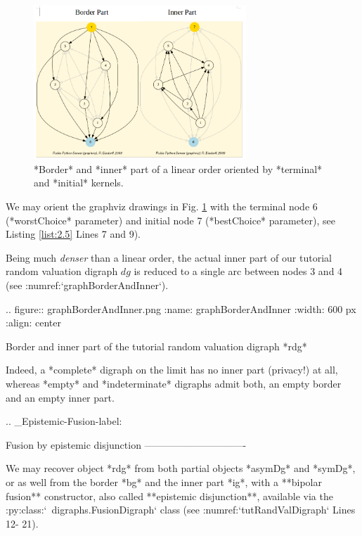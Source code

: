 {\begin{figure}[h]
\includegraphics[width=8cm]{Figures/graphBorderAndInner1.png}
\caption{*Border* and *inner* part of a linear order oriented by *terminal* and *initial* kernels.}
\label{fig:2.3}       %
\end{figure}
   
We may orient the graphviz drawings in Fig. \ref{fig:2.3}  with the terminal node 6 (*worstChoice* parameter) and initial node 7 (*bestChoice* parameter), see Listing \ref{list:2.5} Lines 7 and 9).


Being much {\em denser\/} than a linear order, the actual inner part of our tutorial random valuation digraph $dg$ is reduced to a single arc between nodes 3 and 4 (see :numref:`graphBorderAndInner`).

.. figure:: graphBorderAndInner.png
   :name: graphBorderAndInner
   :width: 600 px
   :align: center

   Border and inner part of the tutorial random valuation digraph *rdg*

Indeed, a *complete* digraph on the limit has no inner part (privacy!) at all, whereas *empty* and *indeterminate* digraphs admit both, an empty border and an empty inner part.

.. _Epistemic-Fusion-label:

Fusion by epistemic disjunction
-------------------------------

We may recover object *rdg* from both partial objects *asymDg* and *symDg*, or as well from the border *bg* and the inner part *ig*, with a **bipolar fusion** constructor, also called **epistemic disjunction**, available via the :py:class:`~digraphs.FusionDigraph` class (see :numref:`tutRandValDigraph` Lines 12- 21). 

}
